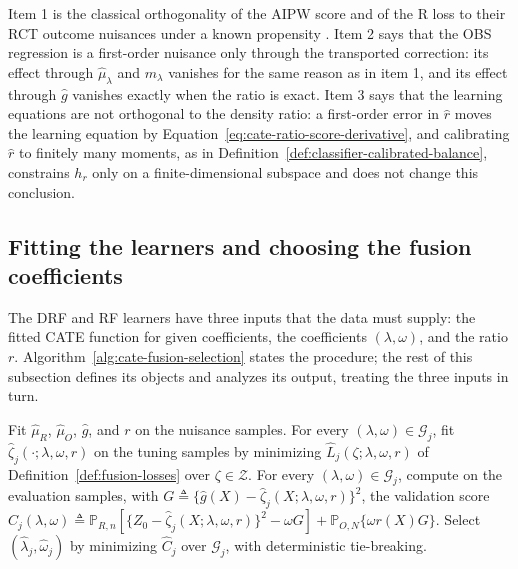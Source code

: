 Item 1 is the classical orthogonality of the AIPW score and of the R loss to their RCT outcome nuisances under a known propensity \citep{chernozhukov2018dml,kennedy2022drlearner,nie2020rlearner}. Item 2 says that the OBS regression is a first-order nuisance only through the transported correction: its effect through $\widehat\mu_\lambda$ and $m_\lambda$ vanishes for the same reason as in item 1, and its effect through $\widehat g$ vanishes exactly when the ratio is exact. Item 3 says that the learning equations are not orthogonal to the density ratio: a first-order error in $\widehat r$ moves the learning equation by Equation~\eqref{eq:cate-ratio-score-derivative}, and calibrating $\widehat r$ to finitely many moments, as in Definition~\ref{def:classifier-calibrated-balance}, constrains $h_r$ only on a finite-dimensional subspace and does not change this conclusion.


\subsection{Fitting the learners and choosing the fusion coefficients}
\label{sec:cate-risk-selection}

The DRF and RF learners have three inputs that the data must supply: the fitted CATE function for given coefficients, the coefficients $(\lambda,\omega)$, and the ratio $r$. Algorithm~\ref{alg:cate-fusion-selection} states the procedure; the rest of this subsection defines its objects and analyzes its output, treating the three inputs in turn.

\begin{algorithm}[H]
\caption{Honest fitting and selection of the CATE fusion learner}
\label{alg:cate-fusion-selection}
\DontPrintSemicolon
{}
Fit $\widehat\mu_R$, $\widehat\mu_O$, $\widehat g$, and $r$ on the nuisance samples.\;
For every $(\lambda,\omega)\in\mathcal G_j$, fit $\widehat\zeta_j(\cdot;\lambda,\omega,r)$ on the tuning samples by minimizing $\widehat L_j(\zeta;\lambda,\omega,r)$ of Definition~\ref{def:fusion-losses} over $\zeta\in\mathcal Z$.\;
For every $(\lambda,\omega)\in\mathcal G_j$, compute on the evaluation samples, with $G\triangleq\{\widehat g(X)-\widehat\zeta_j(X;\lambda,\omega,r)\}^2$, the validation score $\widehat C_j(\lambda,\omega)\triangleq\mathbb P_{R,n}[\{Z_0-\widehat\zeta_j(X;\lambda,\omega,r)\}^2-\omega G]+\mathbb P_{O,N}\{\omega r(X)G\}$.\;
Select $(\widehat\lambda_j,\widehat\omega_j)$ by minimizing $\widehat C_j$ over $\mathcal G_j$, with deterministic tie-breaking.\;
\end{algorithm}

